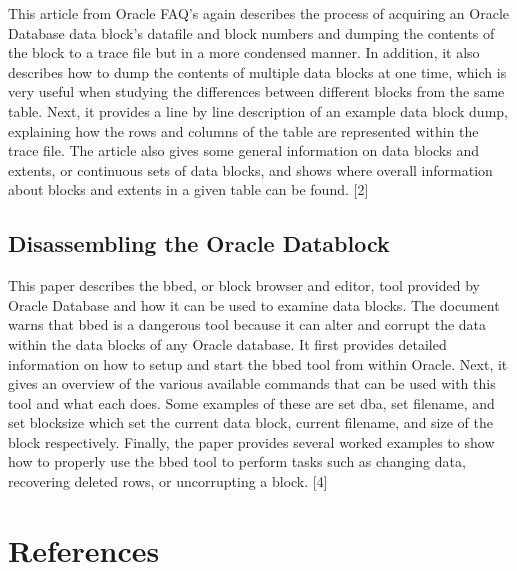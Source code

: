 \documentclass[10pt]{article}
\begin{document}
This article from Oracle FAQ's again describes the process of acquiring an Oracle Database data block's datafile and block numbers and dumping the contents of the block to a trace file but in a more condensed manner.
In addition, it also describes how to dump the contents of multiple data blocks at one time, which is very useful when studying the differences between different blocks from the same table. 
Next, it provides a line by line description of an example data block dump, explaining how the rows and columns of the table are represented within the trace file. 
The article also gives some general information on data blocks and extents, or continuous sets of data blocks, and shows where overall information about blocks and extents in a given table can be found. [2]

\subsection{Disassembling the Oracle Datablock}

This paper describes the bbed, or block browser and editor, tool provided by Oracle Database and how it can be used to examine data blocks.
The document warns that bbed is a dangerous tool because it can alter and corrupt the data within the data blocks of any Oracle database.
It first provides detailed information on how to setup and start the bbed tool from within Oracle. 
Next, it gives an overview of the various available commands that can be used with this tool and what each does.
Some examples of these are set dba, set filename, and set blocksize which set the current data block, current filename, and size of the block respectively.
Finally, the paper provides several worked examples to show how to properly use the bbed tool to perform tasks such as changing data, recovering deleted rows, or uncorrupting a block. [4]

\section{References}
\end{document}
